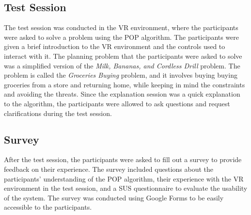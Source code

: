 \subsection{Test Session}
The test session was conducted in the \ac{VR} environment, where the participants were asked to solve a problem using the \ac{POP} algorithm. The participants were given a brief introduction to the \ac{VR} environment and the controls used to interact with it. The planning problem that the participants were asked to solve was a simplified version of the \textit{Milk, Bananas, and Cordless Drill} problem. The problem is called the \textit{Groceries Buying} problem, and it involves buying buying groceries from a store and returning home, while keeping in mind the constraints and avoiding the threats. Since the explanation session was a quick explanation to the algorithm, the participants were allowed to ask questions and request clarifications during the test session.

\subsection{Survey}
After the test session, the participants were asked to fill out a survey to provide feedback on their experience. The survey included questions about the participants' understanding of the \ac{POP} algorithm, their experience with the \ac{VR} environment in the test session, and a \ac{SUS} questionnaire to evaluate the usability of the system. The survey was conducted using Google Forms to be easily accessible to the participants.


